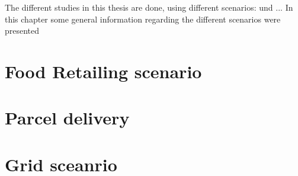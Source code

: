 

The different studies in this thesis are done, using different scenarios:  und  ...
In this chapter some general information regarding the different scenarios were presented

\section{Food Retailing scenario}
\label{sec:gl-scenarios-food}


\section{Parcel delivery}
\label{sec:gl-scenarios-kep}


\section{Grid sceanrio}
\label{sec:gl-scenarios-grid}

